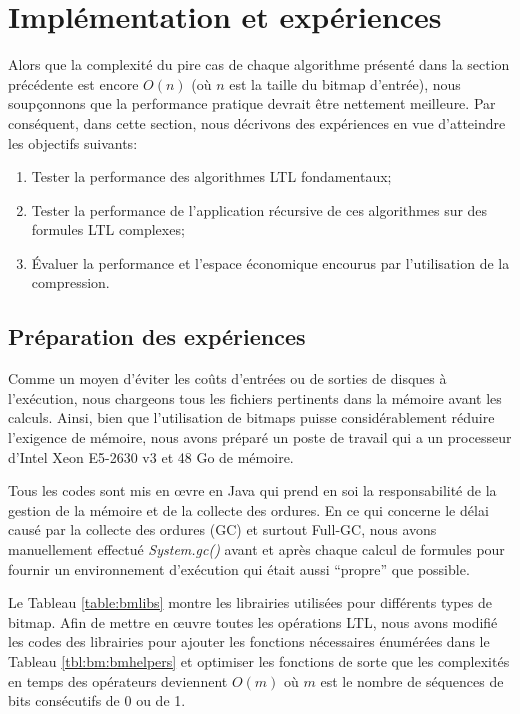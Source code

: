 

\section{Implémentation et expériences}\label{sec:bm:experiments} %

Alors que la complexité du pire cas de chaque algorithme présenté dans la section précédente est encore $O(n)$ (où $n$ est la taille du bitmap d'entrée), nous soupçonnons que la performance pratique devrait être nettement meilleure. Par conséquent, dans cette section, nous décrivons des expériences en vue d'atteindre les objectifs suivants:

\begin{enumerate}
\item Tester la performance des algorithmes LTL fondamentaux;
\item Tester la performance de l'application récursive de ces algorithmes sur des formules LTL complexes;
\item Évaluer la performance et l'espace économique encourus par l'utilisation de la compression.
\end{enumerate}

\subsection{Préparation des expériences} %

Comme un moyen d'éviter les coûts d'entrées ou de sorties de disques à l'exécution, nous chargeons tous les fichiers pertinents dans la mémoire avant les calculs. Ainsi, bien que l'utilisation de bitmaps puisse considérablement réduire l'exigence de mémoire, nous avons préparé un poste de travail qui a un processeur d'Intel Xeon E5-2630 v3 et 48 Go de mémoire.

Tous les codes sont mis en \oe{}vre en Java qui prend en soi la responsabilité de la gestion de la mémoire et de la collecte des ordures. En ce qui concerne le délai causé par la collecte des ordures (GC) et surtout Full-GC, nous avons manuellement effectué \textit{System.gc()} avant et après chaque calcul de formules pour fournir un environnement d'exécution qui était aussi ``propre'' que possible.

Le Tableau \ref{table:bmlibs} montre les librairies utilisées pour différents types de bitmap. Afin de mettre en \oe{}uvre toutes les opérations LTL, nous avons modifié les codes des librairies pour ajouter les fonctions nécessaires énumérées dans le Tableau \ref{tbl:bm:bmhelpers} et optimiser les fonctions de sorte que les complexités en temps des opérateurs deviennent $O(m)$ où $m$ est le nombre de séquences de bits consécutifs de 0 ou de 1.

